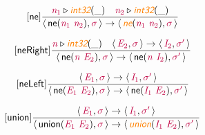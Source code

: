 \documentclass[10pt,leqno,fleqn]{article}
\newcommand{\artVariable}[1]{\mbox{\color{purple}\em #1\/}}
\newcommand{\artConstructor}[1]{\mbox{\sf #1}}
\newcommand{\artSpecial}[1]{\mbox{\color{orange}\sf\em #1}}
\begin{document}
\begin{equation}
\tag*{[\artConstructor{\sf ne}]}
\begin{split}\frac{ \artVariable{n$_{1}$}\triangleright \artSpecial{int32}(\_) \quad  \artVariable{n$_{2}$}\triangleright \artSpecial{int32}(\_) }{\langle\, \artConstructor{\sf ne}(\artVariable{n$_{1}$}\ \artVariable{n$_{2}$}), \artVariable{$\sigma$}\,\rangle \rightarrow \langle\, \artSpecial{ne}(\artVariable{n$_{1}$}\ \artVariable{n$_{2}$}), \artVariable{$\sigma$}\,\rangle }
\end{split}
\end{equation}

\begin{equation}
\tag*{[\artConstructor{\sf neRight}]}
\begin{split}\frac{ \artVariable{n}\triangleright \artSpecial{int32}(\_) \quad \langle\, \artVariable{E$_{2}$}, \artVariable{$\sigma$}\,\rangle \rightarrow \langle\, \artVariable{I$_{2}$}, \artVariable{$\sigma$\/$^\prime$}\,\rangle }{\langle\, \artConstructor{\sf ne}(\artVariable{n}\ \artVariable{E$_{2}$}), \artVariable{$\sigma$}\,\rangle \rightarrow \langle\, \artConstructor{\sf ne}(\artVariable{n}\ \artVariable{I$_{2}$}), \artVariable{$\sigma$\/$^\prime$}\,\rangle }
\end{split}
\end{equation}

\begin{equation}
\tag*{[\artConstructor{\sf neLeft}]}
\begin{split}\frac{\langle\, \artVariable{E$_{1}$}, \artVariable{$\sigma$}\,\rangle \rightarrow \langle\, \artVariable{I$_{1}$}, \artVariable{$\sigma$\/$^\prime$}\,\rangle }{\langle\, \artConstructor{\sf ne}(\artVariable{E$_{1}$}\ \artVariable{E$_{2}$}), \artVariable{$\sigma$}\,\rangle \rightarrow \langle\, \artConstructor{\sf ne}(\artVariable{I$_{1}$}\ \artVariable{E$_{2}$}), \artVariable{$\sigma$\/$^\prime$}\,\rangle }
\end{split}
\end{equation}

\begin{equation}
\tag*{[\artConstructor{\sf union}]}
\begin{split}\frac{\langle\, \artVariable{E$_{1}$}, \artVariable{$\sigma$}\,\rangle \rightarrow \langle\, \artVariable{I$_{1}$}, \artVariable{$\sigma$\/$^\prime$}\,\rangle }{\langle\, \artConstructor{\sf union}(\artVariable{E$_{1}$}\ \artVariable{E$_{2}$}), \artVariable{$\sigma$}\,\rangle \rightarrow \langle\, \artSpecial{union}(\artVariable{I$_{1}$}\ \artVariable{E$_{2}$}), \artVariable{$\sigma$\/$^\prime$}\,\rangle }
\end{split}
\end{equation}
\end{document}
